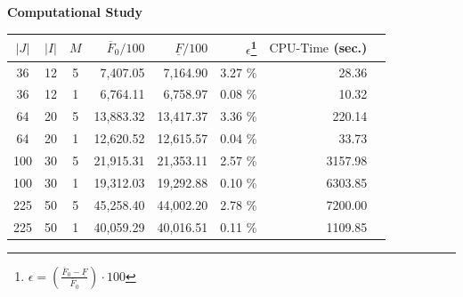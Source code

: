 
\begin{frame}{\textbf{Computational Study}}
\begin{center}
    \small
    \begin{tabular}{cccrrrrr}
    \toprule
        $|J|$ & $|I|$ & $M$ & $\overline{F}_0/100$ & $\underline{F}/100$ & $\epsilon$\footnote{$\epsilon=\left(\frac{\overline{F}_0-\underline{F}}{\overline{F}_0} \right) \cdot 100$} &  $\text{CPU-Time}$ (sec.)  \\ \midrule
        36 & 12 & 5 & 7,407.05 & 7,164.90 & 3.27 \%  & 28.36 \\
        36 & 12 & 1 & 6,764.11 & 6,758.97 & 0.08 \%   & 10.32  \\ \midrule
        64 & 20 & 5 & 13,883.32 & 13,417.37 & 3.36 \%  & 220.14  \\
        64 & 20 & 1 & 12,620.52 & 12,615.57 & 0.04 \% & 33.73 \\ \midrule
        100 & 30 & 5 & 21,915.31 & 21,353.11 & 2.57 \%  & 3157.98 \\
        100 & 30 & 1 & 19,312.03 & 19,292.88 & 0.10 \%  & 6303.85 \\ \midrule 
        225 & 50 & 5 & 45,258.40 & 44,002.20 & 2.78 \%  & 7200.00  \\
        225 & 50 & 1 & 40,059.29 & 40,016.51 & 0.11 \%  & 1109.85  \\ \bottomrule
    \end{tabular}
\end{center}
\end{frame}






